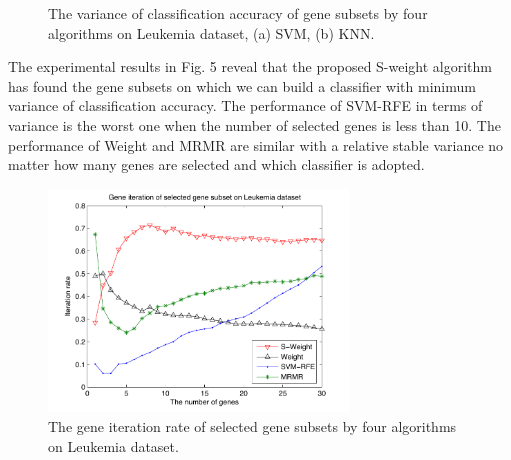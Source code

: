\documentclass[runningheads,a4paper]{llncs}
\begin{document}
\begin{figure}
\centering
{}
\hspace{0.5cm}
\caption{The variance of classification accuracy of gene subsets by four algorithms on Leukemia dataset, (a) SVM, (b) KNN.}
\label{fig:fig5}
\end{figure}

The experimental results in Fig. 5 reveal that the proposed S-weight algorithm has found the gene subsets on which we can build a classifier with minimum variance of classification accuracy. The performance of SVM-RFE in terms of variance is the worst one when the number of selected genes is less than 10. The performance of Weight and MRMR are similar with a relative stable variance no matter how many genes are selected and which classifier is adopted.

\begin{figure} 
\centering    
\includegraphics[width=8cm]{fig6.pdf}
\caption{ The gene iteration rate of selected gene subsets by four algorithms on Leukemia dataset. }     
\label{fig:fig6}     
\end{figure}
\end{document}
